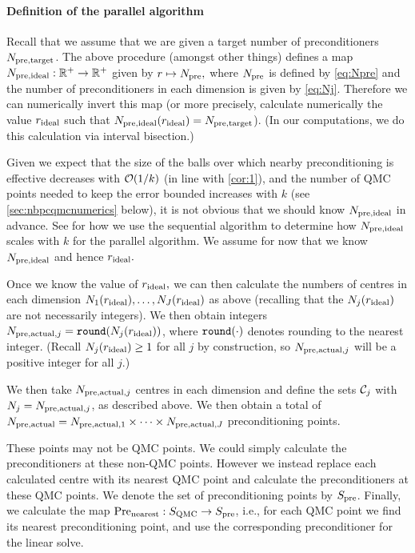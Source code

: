     \paragraph{Definition of the parallel algorithm} Recall that we assume that we are given a target number of preconditioners $N_{\mathrm{pre,target}}$. The above procedure (amongst other things) defines a map $N_{\mathrm{pre,ideal}}:\mathbb R^{+} \rightarrow \mathbb R^{+}$ given by $r \mapsto N_{\mathrm{pre}},$ where $N_{\mathrm{pre}}$ is defined by \cref{eq:Npre} and the number of preconditioners in each dimension is given by \cref{eq:Nj}.  Therefore we can numerically invert this map (or more precisely, calculate numerically the value $r_{\mathrm{ideal}}$ such that $N_{\mathrm{pre,ideal}}(r_{\mathrm{ideal}}) = N_{\mathrm{pre,target}}$). (In our computations, we do this calculation via interval bisection.)

Given we expect that the size of the balls over which nearby preconditioning is effective decreases with $\cO\mleft(1/k\mright)$ (in line with \cref{cor:1}), and the number of QMC points needed to keep the error bounded increases with $k$ (see \cref{sec:nbpcqmcnumerics} below), it is not obvious that we should know $N_{\mathrm{pre,ideal}}$ in advance. See  for how we use the sequential algorithm to determine how $N_{\mathrm{pre,ideal}}$ scales with $k$ for the parallel algorithm. We assume for now that we know $N_{\mathrm{pre,ideal}}$ and hence $r_{\mathrm{ideal}}.$

    Once we know the value of $r_{\mathrm{ideal}},$ we can then calculate the numbers of centres in each dimension $N_{1}(r_{\mathrm{ideal}}),\ldots,N_{J}(r_{\mathrm{ideal}})$ as above (recalling that the $N_{j}(r_{\mathrm{ideal}})$ are not necessarily integers). We then obtain integers $\Npreactualj = \round{\Nj(\rideal)}$, where $\round{\cdot}$ denotes rounding to the nearest integer. (Recall $N_{j}(r_{\mathrm{ideal}}) \geq 1$ for all $j$ by construction, so $N_{\mathrm{pre,actual},j}$ will be a positive integer for all $j.$)

We then take $N_{\mathrm{pre,actual},j}$ centres in each dimension and define the sets $\mathcal C_{j}$ with $N_{j} = N_{\mathrm{pre,actual},j}$, as described above. We then obtain a total of $N_{\mathrm{pre,actual}} = N_{\mathrm{pre,actual},1} \times \cdots \times N_{\mathrm{pre,actual},J}$ preconditioning points.

These points may not be QMC points. We could simply calculate the preconditioners at these non-QMC points. However we instead replace each calculated centre with its nearest QMC point and calculate the preconditioners at these QMC points. We denote the set of preconditioning points by $S_{\mathrm{pre}}$. Finally, we calculate the map $\mathrm{Pre}_{\mathrm{nearest}}:S_{\mathrm{QMC}}\rightarrow S_{\mathrm{pre}}$, i.e., for each QMC point we find its nearest preconditioning point, and use the corresponding preconditioner for the linear solve.


